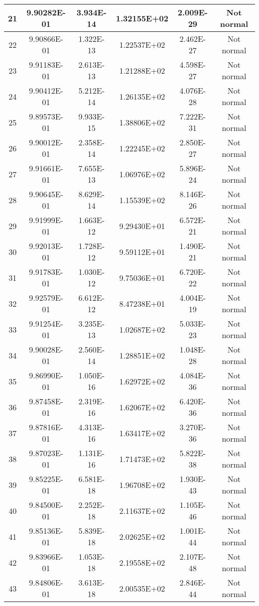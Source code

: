 \begin{table}[h]
\begin{tabular}{|c|c|c|c|c|c|}
		21 & 9.90282E-01 & 3.934E-14 & 1.32155E+02 & 2.009E-29 & Not normal\\\hline
		22 & 9.90866E-01 & 1.322E-13 & 1.22537E+02 & 2.462E-27 & Not normal\\\hline
		23 & 9.91183E-01 & 2.613E-13 & 1.21288E+02 & 4.598E-27 & Not normal\\\hline
		24 & 9.90412E-01 & 5.212E-14 & 1.26135E+02 & 4.076E-28 & Not normal\\\hline
		25 & 9.89573E-01 & 9.933E-15 & 1.38806E+02 & 7.222E-31 & Not normal\\\hline
		26 & 9.90012E-01 & 2.358E-14 & 1.22245E+02 & 2.850E-27 & Not normal\\\hline
		27 & 9.91661E-01 & 7.655E-13 & 1.06976E+02 & 5.896E-24 & Not normal\\\hline
		28 & 9.90645E-01 & 8.629E-14 & 1.15539E+02 & 8.146E-26 & Not normal\\\hline
		29 & 9.91999E-01 & 1.663E-12 & 9.29430E+01 & 6.572E-21 & Not normal\\\hline
		30 & 9.92013E-01 & 1.728E-12 & 9.59112E+01 & 1.490E-21 & Not normal\\\hline
		31 & 9.91783E-01 & 1.030E-12 & 9.75036E+01 & 6.720E-22 & Not normal\\\hline
		32 & 9.92579E-01 & 6.612E-12 & 8.47238E+01 & 4.004E-19 & Not normal\\\hline
		33 & 9.91254E-01 & 3.235E-13 & 1.02687E+02 & 5.033E-23 & Not normal\\\hline
		34 & 9.90028E-01 & 2.560E-14 & 1.28851E+02 & 1.048E-28 & Not normal\\\hline
		35 & 9.86990E-01 & 1.050E-16 & 1.62972E+02 & 4.084E-36 & Not normal\\\hline
		36 & 9.87458E-01 & 2.319E-16 & 1.62067E+02 & 6.420E-36 & Not normal\\\hline
		37 & 9.87816E-01 & 4.313E-16 & 1.63417E+02 & 3.270E-36 & Not normal\\\hline
		38 & 9.87023E-01 & 1.131E-16 & 1.71473E+02 & 5.822E-38 & Not normal\\\hline
		39 & 9.85225E-01 & 6.581E-18 & 1.96708E+02 & 1.930E-43 & Not normal\\\hline
		40 & 9.84500E-01 & 2.252E-18 & 2.11637E+02 & 1.105E-46 & Not normal\\\hline
		41 & 9.85136E-01 & 5.839E-18 & 2.02625E+02 & 1.001E-44 & Not normal\\\hline
		42 & 9.83966E-01 & 1.053E-18 & 2.19558E+02 & 2.107E-48 & Not normal\\\hline
		43 & 9.84806E-01 & 3.613E-18 & 2.00535E+02 & 2.846E-44 & Not normal\\\hline

\end{tabular}
\end{table}
